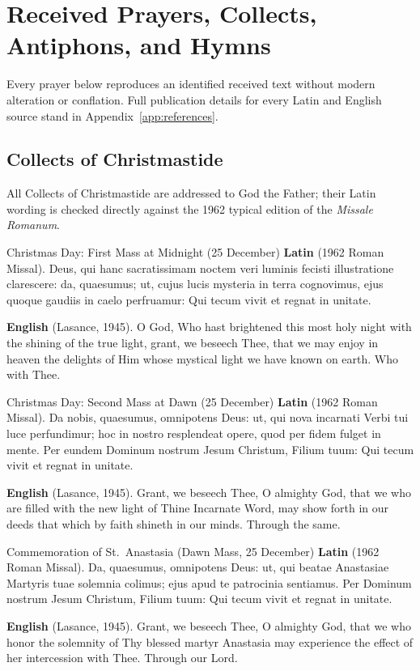 \section{Received Prayers, Collects, Antiphons, and Hymns}\label{app:prayers}

Every prayer below reproduces an identified received text without modern
alteration or conflation. Full publication details for every Latin and English
source stand in Appendix~\ref{app:references}.

\subsection{Collects of Christmastide}

All Collects of Christmastide are addressed to God the Father; their Latin
wording is checked directly against the 1962 typical edition of the
\textit{Missale Romanum}.

\begin{massbox}{Christmas Day: First Mass at Midnight (25 December)}
\textbf{Latin} (1962 Roman Missal). Deus, qui hanc sacratissimam noctem veri
luminis fecisti illustratione clarescere: da, quaesumus; ut, cujus lucis
mysteria in terra cognovimus, ejus quoque gaudiis in caelo perfruamur: Qui
tecum vivit et regnat in unitate.

\textbf{English} (Lasance, 1945). O God, Who hast brightened this most holy
night with the shining of the true light, grant, we beseech Thee, that we may
enjoy in heaven the delights of Him whose mystical light we have known on earth.
Who with Thee.
\end{massbox}

\begin{massbox}{Christmas Day: Second Mass at Dawn (25 December)}
\textbf{Latin} (1962 Roman Missal). Da nobis, quaesumus, omnipotens Deus: ut,
qui nova incarnati Verbi tui luce perfundimur; hoc in nostro resplendeat opere,
quod per fidem fulget in mente. Per eundem Dominum nostrum Jesum Christum,
Filium tuum: Qui tecum vivit et regnat in unitate.

\textbf{English} (Lasance, 1945). Grant, we beseech Thee, O almighty God, that
we who are filled with the new light of Thine Incarnate Word, may show forth in
our deeds that which by faith shineth in our minds. Through the same.
\end{massbox}

\begin{massbox}{Commemoration of St.~Anastasia (Dawn Mass, 25 December)}
\textbf{Latin} (1962 Roman Missal). Da, quaesumus, omnipotens Deus: ut, qui
beatae Anastasiae Martyris tuae solemnia colimus; ejus apud te patrocinia
sentiamus. Per Dominum nostrum Jesum Christum, Filium tuum: Qui tecum vivit et
regnat in unitate.

\textbf{English} (Lasance, 1945). Grant, we beseech Thee, O almighty God, that
we who honor the solemnity of Thy blessed martyr Anastasia may experience the
effect of her intercession with Thee. Through our Lord.
\end{massbox}

